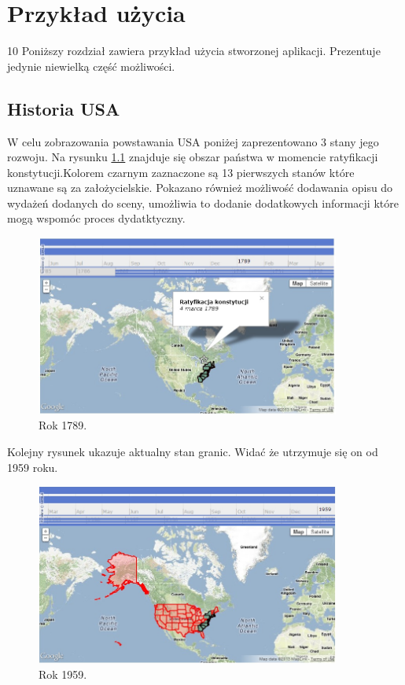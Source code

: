 \chapter{Przykład użycia}
\label{sec:useexample}
10 %
Poniższy rozdział zawiera przykład użycia stworzonej aplikacji. Prezentuje jedynie niewielką część możliwości.


\section{Historia USA}
\label{sec:usahistory}

W celu zobrazowania powstawania USA poniżej zaprezentowano 3 stany jego rozwoju. Na rysunku \ref{fig:st1} znajduje się obszar państwa w momencie ratyfikacji konstytucji.Kolorem czarnym zaznaczone są 13 pierwszych stanów które uznawane są za założycielskie. Pokazano również możliwość dodawania opisu do wydażeń dodanych do sceny, umożliwia to dodanie dodatkowych informacji które mogą wspomóc proces dydatktyczny.

\begin{figure}[H]
  \centering
    \includegraphics[width=100mm]{ge/st1.jpg}
  \caption{Rok 1789.}
  \label{fig:st1}
\end{figure}

Kolejny rysunek ukazuje aktualny stan granic. Widać że utrzymuje się on od 1959 roku.

\begin{figure}[H]
  \centering
    \includegraphics[width=100mm]{ge/st3.jpg}
  \caption{Rok 1959.}
  \label{fig:st3}
\end{figure}
